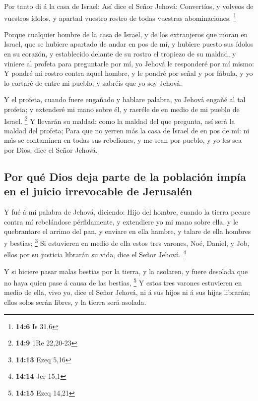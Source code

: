  Por tanto di á la casa de Israel: Así dice el Señor Jehová:
Convertíos, y volveos de vuestros ídolos, y apartad vuestro rostro de
todas vuestras abominaciones. \footnote{\textbf{14:6} Is 31,6}

 Porque cualquier hombre de la casa de Israel, y de los
extranjeros que moran en Israel, que se hubiere apartado de andar en pos
de mí, y hubiere puesto sus ídolos en su corazón, y establecido delante
de su rostro el tropiezo de su maldad, y viniere al profeta para
preguntarle por mí, yo Jehová le responderé por mí mismo:  Y
pondré mi rostro contra aquel hombre, y le pondré por señal y por
fábula, y yo lo cortaré de entre mi pueblo; y sabréis que yo soy Jehová.

 Y el profeta, cuando fuere engañado y hablare palabra, yo
Jehová engañé al tal profeta; y extenderé mi mano sobre él, y raeréle de
en medio de mi pueblo de Israel. \footnote{\textbf{14:9} 1Re 22,20-23}
 Y llevarán su maldad: como la maldad del que pregunta, así
será la maldad del profeta;  Para que no yerren más la casa
de Israel de en pos de mí: ni más se contaminen en todas sus rebeliones,
y me sean por pueblo, y yo les sea por Dios, dice el Señor Jehová.

\hypertarget{por-quuxe9-dios-deja-parte-de-la-poblaciuxf3n-impuxeda-en-el-juicio-irrevocable-de-jerusaluxe9n}{%
\subsection{Por qué Dios deja parte de la población impía en el juicio
irrevocable de
Jerusalén}\label{por-quuxe9-dios-deja-parte-de-la-poblaciuxf3n-impuxeda-en-el-juicio-irrevocable-de-jerusaluxe9n}}

 Y fué á mí palabra de Jehová, diciendo:  Hijo
del hombre, cuando la tierra pecare contra mí rebelándose pérfidamente,
y extendiere yo mi mano sobre ella, y le quebrantare el arrimo del pan,
y enviare en ella hambre, y talare de ella hombres y bestias;
\footnote{\textbf{14:13} Ezeq 5,16}  Si estuvieren en medio
de ella estos tres varones, Noé, Daniel, y Job, ellos por su justicia
librarán su vida, dice el Señor Jehová. \footnote{\textbf{14:14} Jer
  15,1}

 Y si hiciere pasar malas bestias por la tierra, y la
asolaren, y fuere desolada que no haya quien pase á causa de las
bestias, \footnote{\textbf{14:15} Ezeq 14,21}  Y estos tres
varones estuvieren en medio de ella, vivo yo, dice el Señor Jehová, ni á
sus hijos ni á sus hijas librarán; ellos solos serán libres, y la tierra
será asolada.

